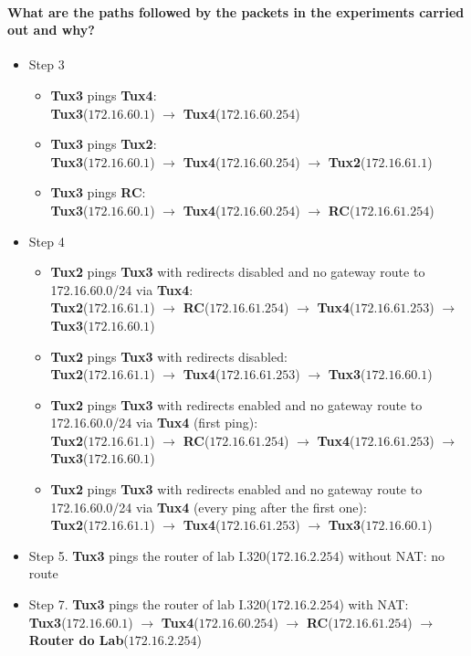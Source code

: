 \documentclass[11pt]{report}
\newcommand{\tux}[1]{\textbf{Tux#1}}
\begin{document}
\paragraph{What are the paths followed by the packets in the experiments carried out and why?}
\begin{itemize}
  \item Step 3
  \begin{itemize}
    \item \tux{3} pings \tux{4}:\\
      \tux{3}($172.16.60.1$) $\rightarrow$ \tux{4}($172.16.60.254$)
    \item \tux{3} pings \tux{2}:\\
      \tux{3}($172.16.60.1$) $\rightarrow$ \tux{4}($172.16.60.254$) $\rightarrow$
      \tux{2}($172.16.61.1$)
    \item \tux{3} pings \textbf{RC}:\\
      \tux{3}($172.16.60.1$) $\rightarrow$ \tux{4}($172.16.60.254$) $\rightarrow$
      \textbf{RC}($172.16.61.254$)
  \end{itemize}
  \item Step 4
  \begin{itemize}
    \item \tux{2} pings \tux{3} with redirects disabled and no gateway route to 172.16.60.0/24 via \tux{4}:\\
      \tux{2}($172.16.61.1$) $\rightarrow$ \textbf{RC}($172.16.61.254$) $\rightarrow$
      \tux{4}($172.16.61.253$) $\rightarrow$ \tux{3}($172.16.60.1$)
    \item \tux{2} pings \tux{3} with redirects disabled:\\
      \tux{2}($172.16.61.1$) $\rightarrow$ \tux{4}($172.16.61.253$) $\rightarrow$
      \tux{3}($172.16.60.1$)
    \item \tux{2} pings \tux{3} with redirects enabled and no gateway route to 172.16.60.0/24 via \tux{4} (first ping):\\
      \tux{2}($172.16.61.1$) $\rightarrow$ \textbf{RC}($172.16.61.254$) $\rightarrow$
      \tux{4}($172.16.61.253$) $\rightarrow$ \tux{3}($172.16.60.1$)
    \item \tux{2} pings \tux{3} with redirects enabled and no gateway route to 172.16.60.0/24 via \tux{4}
      (every ping after the first one):\\
      \tux{2}($172.16.61.1$) $\rightarrow$ \tux{4}($172.16.61.253$) $\rightarrow$ \tux{3}($172.16.60.1$)
  \end{itemize}
  \item Step 5. \tux{3} pings the router of lab I.320($172.16.2.254$) without NAT: no route
  \item Step 7. \tux{3} pings the router of lab I.320($172.16.2.254$) with NAT:\\
    \tux{3}($172.16.60.1$) $\rightarrow$ \tux{4}($172.16.60.254$) $\rightarrow$
    \textbf{RC}($172.16.61.254$) $\rightarrow$ \textbf{Router do Lab}($172.16.2.254$)
\end{itemize}
\end{document}
